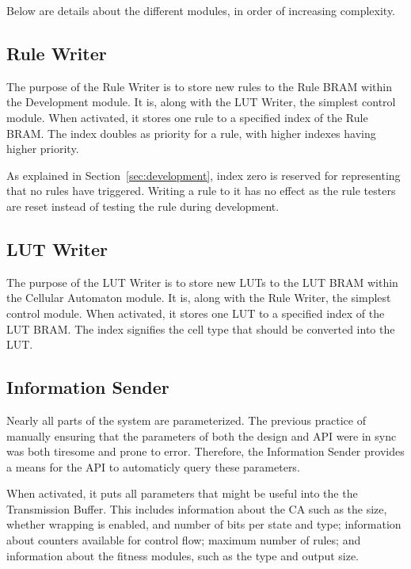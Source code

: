 Below are details about the different modules, in order of increasing complexity.

\subsection{Rule Writer}

The purpose of the Rule Writer is to store new rules to the Rule BRAM within the Development module.
It is, along with the LUT Writer, the simplest control module.
When activated, it stores one rule to a specified index of the Rule BRAM.
The index doubles as priority for a rule, with higher indexes having higher priority.

As explained in Section~\ref{sec:development}, index zero is reserved for representing that no rules have triggered.
Writing a rule to it has no effect as the rule testers are reset instead of testing the rule during development.

\subsection{LUT Writer}

The purpose of the LUT Writer is to store new LUTs to the LUT BRAM within the Cellular Automaton module.
It is, along with the Rule Writer, the simplest control module.
When activated, it stores one LUT to a specified index of the LUT BRAM.
The index signifies the cell type that should be converted into the LUT.

\subsection{Information Sender}

Nearly all parts of the system are parameterized.
The previous practice of manually ensuring that the parameters of both the design and API were in sync was both tiresome and prone to error.
Therefore, the Information Sender provides a means for the API to automaticly query these parameters.

When activated, it puts all parameters that might be useful into the the Transmission Buffer.
This includes information about the CA such as the size, whether wrapping is enabled, and number of bits per state and type;
information about counters available for control flow;
maximum number of rules;
and information about the fitness modules, such as the type and output size.

